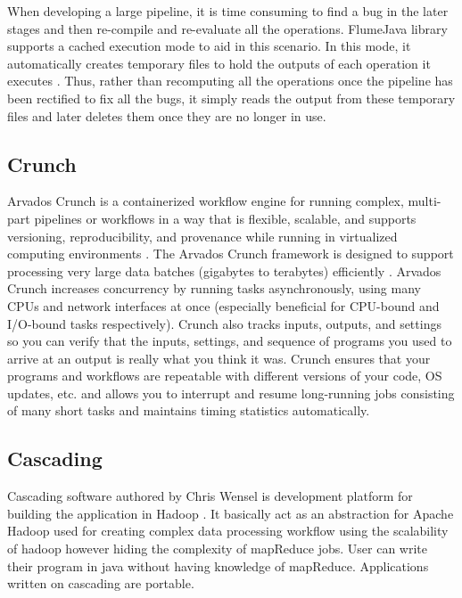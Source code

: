     When developing a large pipeline, it is time consuming to find a
    bug in the later stages and then re-compile and re-evaluate all
    the operations. FlumeJava library supports a cached execution mode
    to aid in this scenario. In this mode, it automatically creates
    temporary files to hold the outputs of each operation it
    executes \cite{flumejava-paper}. Thus, rather than recomputing
    all the operations once the pipeline has been rectified to fix all
    the bugs, it simply reads the output from these temporary files
    and later deletes them once they are no longer in use.    

\pv

\subsection{Crunch}

    Arvados Crunch is a containerized workflow
    engine for running complex, multi-part pipelines or workflows in a
    way that is flexible, scalable, and supports versioning,
    reproducibility, and provenance while running in virtualized
    computing environments \cite{www-arvados}. The Arvados
    Crunch framework is designed to support processing
    very large data batches (gigabytes to terabytes)
    efficiently \cite{www-crunch}. Arvados Crunch
    increases concurrency by running tasks asynchronously, using many
    CPUs and network interfaces at once (especially beneficial for
    CPU-bound and I/O-bound tasks respectively). Crunch also tracks
    inputs, outputs, and settings so you can verify that the inputs,
    settings, and sequence of programs you used to arrive at an output
    is really what you think it was. Crunch ensures that your programs
    and workflows are repeatable with different versions of your code,
    OS updates, etc. and allows you to interrupt and resume
    long-running jobs consisting of many short tasks and maintains
    timing statistics automatically.

    \pv

\subsection{Cascading}

    Cascading software authored by Chris Wensel
    is development platform for building the application in Hadoop \cite{www-cascading}.
    It basically act as an abstraction for Apache Hadoop used for
    creating complex data processing workflow using the scalability of
    hadoop however hiding the complexity of mapReduce jobs.  User can
    write their program in java without having knowledge of
    mapReduce. Applications written on cascading are portable.
 
